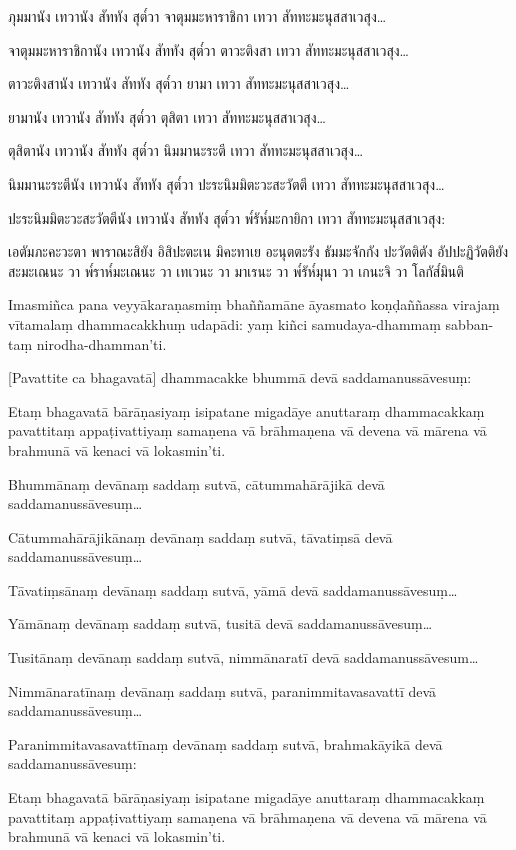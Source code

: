 \documentclass[
  babelLanguage=thai,
  final,
]{chantingbook}
\begin{document}
ภุมมานัง เทวานัง สัททัง สุต๎วา จาตุมมะหาราชิกา เทวา สัททะมะนุสสาเวสุง\ldots
 
จาตุมมะหาราชิกานัง เทวานัง สัททัง สุต๎วา ตาวะติงสา เทวา สัททะมะนุสสาเวสุง\ldots
 
ตาวะติงสานัง เทวานัง สัททัง สุต๎วา ยามา เทวา สัททะมะนุสสาเวสุง\ldots

ยามานัง เทวานัง สัททัง สุต๎วา ตุสิตา เทวา สัททะมะนุสสาเวสุง\ldots

ตุสิตานัง เทวานัง สัททัง สุต๎วา นิมมานะระตี เทวา สัททะมะนุสสาเวสุง\ldots

นิมมานะระตีนัง เทวานัง สัททัง สุต๎วา ปะระนิมมิตะวะสะวัตตี เทวา สัททะมะนุสสาเวสุง\ldots

ปะระนิมมิตะวะสะวัตตีนัง เทวานัง สัททัง สุต๎วา พ๎รัห๎มะกายิกา เทวา สัททะมะนุสสาเวสุง:

เอตัมภะคะวะตา พาราณะสิยัง อิสิปะตะเน มิคะทาเย
อะนุตตะรัง ธัมมะจักกัง ปะวัตติตัง อัปปะฏิวัตติยัง สะมะเณนะ วา
พ๎ราห๎มะเณนะ วา เทเวนะ วา มาเรนะ วา พ๎รัห๎มุนา วา เกนะจิ วา โลกัส๎มินติ

\clearpage

\paliText
\markboth{\paliTitle}{\rightmark}

Imasmiñca pana veyyākaraṇasmiṃ bhaññamāne āyasmato koṇḍaññassa virajaṃ
vītamalaṃ dhammacakkhuṃ udapādi: yaṃ kiñci samudaya-dhammaṃ sabban-taṃ
nirodha-dhamman'ti.

[Pavattite ca bhagavatā] dhammacakke bhummā devā saddamanussāvesuṃ:

Etaṃ bhagavatā bārāṇasiyaṃ isipatane migadāye anuttaraṃ dhammacakkaṃ
pavattitaṃ appaṭivattiyaṃ samaṇena vā brāhmaṇena vā devena vā mārena vā
brahmunā vā kenaci vā lokasmin'ti.

Bhummānaṃ devānaṃ saddaṃ sutvā, cātummahārājikā devā
saddamanussāvesuṃ\ldots

Cātummahārājikānaṃ devānaṃ saddaṃ sutvā, tāvatiṃsā devā
saddamanussāvesuṃ\ldots

Tāvatiṃsānaṃ devānaṃ saddaṃ sutvā, yāmā devā saddamanussāvesuṃ\ldots

Yāmānaṃ devānaṃ saddaṃ sutvā, tusitā devā saddamanussāvesuṃ\ldots

Tusitānaṃ devānaṃ saddaṃ sutvā, nimmānaratī devā saddamanussāvesum\ldots

Nimmānaratīnaṃ devānaṃ saddaṃ sutvā, paranimmitavasavattī devā
saddamanussāvesuṃ\ldots

Paranimmitavasavattīnaṃ devānaṃ saddaṃ sutvā, brahmakāyikā devā
saddamanussāvesuṃ:

Etaṃ bhagavatā bārāṇasiyaṃ isipatane migadāye anuttaraṃ dhammacakkaṃ
pavattitaṃ appaṭivattiyaṃ samaṇena vā brāhmaṇena vā devena vā mārena vā
brahmunā vā kenaci vā lokasmin'ti.
\end{document}
